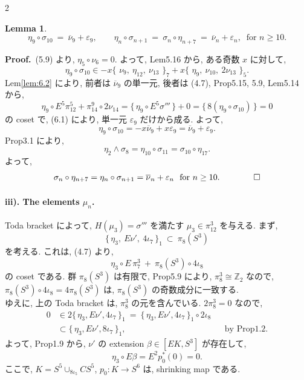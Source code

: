 \documentclass[10pt, leqno]{ltjsarticle}
\newcommand{\todai}[2][]{\{\,#2\,\}_{#1}}      %
\newcommand{\gen}[1]{\{\,#1\,\}}       %
\newcommand{\pis}[2]{\pi_{#1}(#2)}       %
\newcommand{\pit}[2]{\pi_{#1}^{#2}}
\numberwithin{equation}{section}
\theoremstyle{plain}
\newtheorem{lemma}[theorem]{Lemma}
\theoremstyle{definition}
\theoremstyle{remark}
\begin{document}
\begin{paracol}{2}

\begin{lemma}\label{lem:6.4}
\[
\eta_9\circ \sigma_{10}\ =\ \overline\nu_9+\varepsilon_9,
\qquad \eta_n\circ \sigma_{n+1}\ =\ 
\sigma_n \circ\eta_{n+7}\ =\
\overline\nu_n+\varepsilon_n,\ \text{ for } n\ge10.
\]
\end{lemma}

\noindent
\textbf{Proof.}\
(5.9) より, \(\eta_5\circ \nu_6=0 .\)
よって, Lem5.16 から, ある奇数 \(x\) に対して, 
\[
\eta_9\circ \sigma_{10}\in
-x\todai[7]{\,\nu_9,\ \eta_{12},\ \nu_{13}\,}
+x\todai[5]{\,\eta_9,\ \nu_{10},\ 2\nu_{13}\,} .
\]
Lem\ref{lem:6.2} により, 前者は \(\overline\nu_9\) の単一元, 
後者は (4.7), Prop5.15, 5.9, Lem5.14 から,
\[
\eta_9\circ E^5\pit{12}{5} + \pit{14}{9}\circ2\nu_{14}
= \gen{\eta_9\circ E^5\sigma'''} + 0
= \gen{8(\eta_9\circ\sigma_{10})} = 0
\]
の coset で, (6.1) により, 
単一元 \(\varepsilon_9\) だけから成る. よって,
\[
\eta_9\circ \sigma_{10}=-x\overline\nu_9+x\varepsilon_9=\overline\nu_9+\varepsilon_9 .
\]
Prop3.1 により,
\[
\eta_2\wedge\sigma_8=\eta_{10}\circ\sigma_{11}=\sigma_{10}\circ \eta_{17} .
\] 
よって, 
\[
\sigma_n\circ\eta_{n+7}
=\eta_n\circ \sigma_{n+1}
=\overline\nu_n+\varepsilon_n\ 
\text{ for } n\ge10.
\qquad
\qed
\]

\paragraph{iii). The elements \(\mu_n\).}

Toda bracket によって, \(H(\mu_3)=\sigma'''\) を満たす
\(\mu_3\in \pit{12}{3}\) を与える. 
まず,
\[
\todai[1]{\eta_3,\ E\nu',\ 4\iota_7}\ \subset\ \pi_8(S^3)
\]
を考える. これは, (4.7) より,
\[
\eta_3\circ E\,\pi^{3}_{7}\ 
+\ \pi_8(S^3)\circ 4\iota_8
\] 
の coset である. 
群 \(\pi_8(S^3)\) は有限で, Prop5.9 により, 
\(\pi^{3}_{8}\cong \mathbb Z_2\)
なので, \\
\(\pi_8(S^3)\circ 4\iota_8 = 4\pi_8(S^3)\) は,
\(\pis{8}{S^3}\)
の奇数成分に一致する. \\
ゆえに, 上の Toda bracket は,
\(\pit{8}{3}\) の元を含んでいる. 
\(2\pit{8}{3} = 0\) なので, 
\[
\begin{align*}
  0 & \in 2\todai[1]{\eta_3, E\nu', 4\iota_7}
  \ = \ \todai[1]{\eta_3, E\nu', 4\iota_7} \circ 2\iota_8\\
  & \subset \todai[1]{\eta_3, E\nu', 8\iota_7}, \ 
  && \text{by Prop1.2}.  
\end{align*}
\]
よって, Prop1.9 から, 
\(\nu'\) の extension \(\beta\in[EK, S^{3}]\) が存在して,
\[
\eta_{3}\circ E\beta = E^2 p_{0}^{\ast}(0) = 0 .
\]
ここで,  \(K=S^{5}\cup_{8\iota_5}CS^{5}\), 
\(p_{0}:K\to S^{6}\) は, shrinking map である.


\end{paracol}
\end{document}
